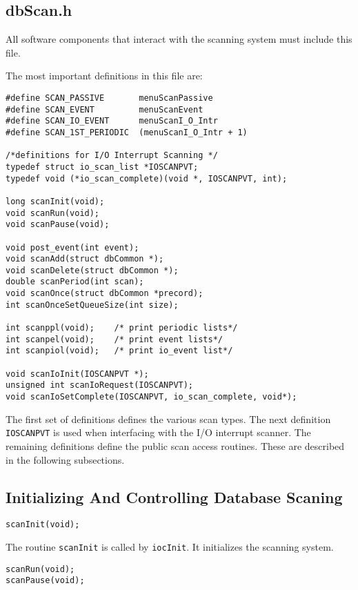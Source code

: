 \subsection{dbScan.h}

All software components that interact with the scanning system must include this file.

The most important definitions in this file are:

\begin{verbatim}
#define SCAN_PASSIVE       menuScanPassive
#define SCAN_EVENT         menuScanEvent
#define SCAN_IO_EVENT      menuScanI_O_Intr
#define SCAN_1ST_PERIODIC  (menuScanI_O_Intr + 1)

/*definitions for I/O Interrupt Scanning */
typedef struct io_scan_list *IOSCANPVT;
typedef void (*io_scan_complete)(void *, IOSCANPVT, int);

long scanInit(void);
void scanRun(void);
void scanPause(void);

void post_event(int event);
void scanAdd(struct dbCommon *);
void scanDelete(struct dbCommon *);
double scanPeriod(int scan);
void scanOnce(struct dbCommon *precord);
int scanOnceSetQueueSize(int size);

int scanppl(void);    /* print periodic lists*/
int scanpel(void);    /* print event lists*/
int scanpiol(void);   /* print io_event list*/

void scanIoInit(IOSCANPVT *);
unsigned int scanIoRequest(IOSCANPVT);
void scanIoSetComplete(IOSCANPVT, io_scan_complete, void*);
\end{verbatim}

The first set of definitions defines the various scan types. The next definition \verb|IOSCANPVT| is used when interfacing with 
the I/O interrupt scanner. The remaining definitions define the public scan access routines. These are described in the 
following subsections.

\subsection{Initializing And Controlling Database Scaning}

\begin{verbatim}
scanInit(void);
\end{verbatim}

The routine \verb|scanInit| is called by \verb|iocInit|. It initializes the scanning system.

\begin{verbatim}
scanRun(void);
scanPause(void);
\end{verbatim}

